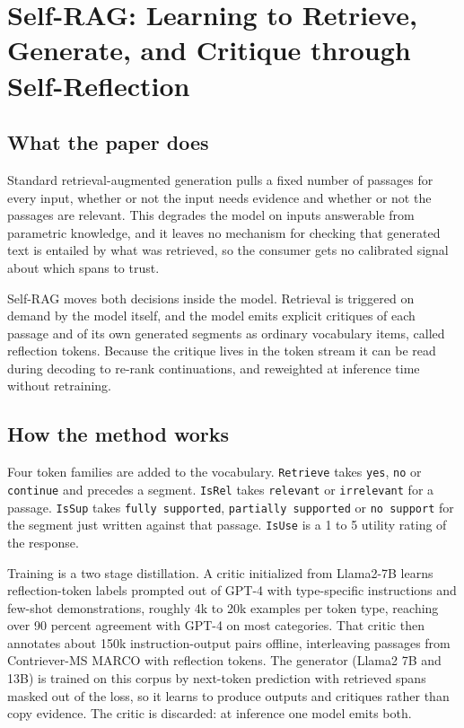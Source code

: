 \section{Self-RAG: Learning to Retrieve, Generate, and Critique through Self-Reflection}

\subsection{What the paper does}

Standard retrieval-augmented generation pulls a fixed number of passages for every input, whether or not the input needs evidence and whether or not the passages are relevant. This degrades the model on inputs answerable from parametric knowledge, and it leaves no mechanism for checking that generated text is entailed by what was retrieved, so the consumer gets no calibrated signal about which spans to trust.

Self-RAG moves both decisions inside the model. Retrieval is triggered on demand by the model itself, and the model emits explicit critiques of each passage and of its own generated segments as ordinary vocabulary items, called reflection tokens. Because the critique lives in the token stream it can be read during decoding to re-rank continuations, and reweighted at inference time without retraining.

\subsection{How the method works}

Four token families are added to the vocabulary. \texttt{Retrieve} takes \texttt{yes}, \texttt{no} or \texttt{continue} and precedes a segment. \texttt{IsRel} takes \texttt{relevant} or \texttt{irrelevant} for a passage. \texttt{IsSup} takes \texttt{fully supported}, \texttt{partially supported} or \texttt{no support} for the segment just written against that passage. \texttt{IsUse} is a 1 to 5 utility rating of the response.

Training is a two stage distillation. A critic initialized from Llama2-7B learns reflection-token labels prompted out of GPT-4 with type-specific instructions and few-shot demonstrations, roughly 4k to 20k examples per token type, reaching over 90 percent agreement with GPT-4 on most categories. That critic then annotates about 150k instruction-output pairs offline, interleaving passages from Contriever-MS MARCO with reflection tokens. The generator (Llama2 7B and 13B) is trained on this corpus by next-token prediction with retrieved spans masked out of the loss, so it learns to produce outputs and critiques rather than copy evidence. The critic is discarded: at inference one model emits both.

